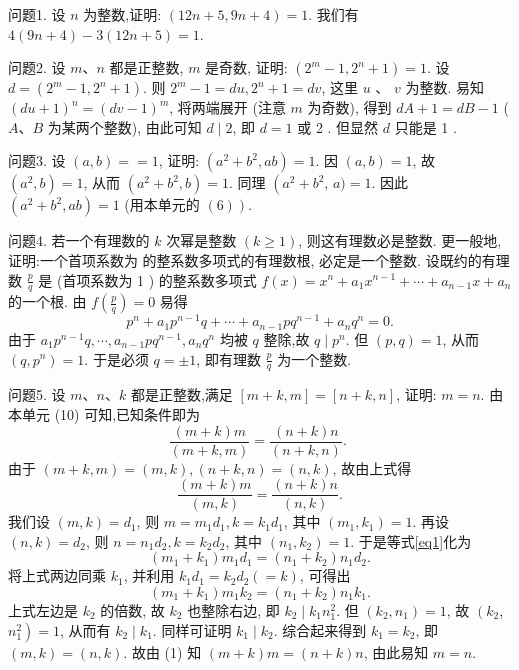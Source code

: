 
问题1. 设 $n$ 为整数,证明: $(12 n+5,9 n+4)=1$.
我们有 $4(9 n+4)-3(12 n+5)=1$.



问题2. 设 $m 、 n$ 都是正整数, $m$ 是奇数, 证明: $\left(2^m-1,2^n+1\right)=1$.
设 $d=\left(2^m-1,2^n+1\right)$. 则 $2^m-1=d u, 2^n+1=d v$, 这里 $u$ 、 $v$ 为整数.
易知 $(d u+1)^n=(d v-1)^m$, 将两端展开 (注意 $m$ 为奇数), 得到 $d A+ 1=d B-1$ ( $A 、 B$ 为某两个整数), 由此可知 $d \mid 2$, 即 $d=1$ 或 2 . 但显然 $d$ 只能是 1 .



问题3. 设 $(a, b)==1$, 证明: $\left(a^2+b^2, a b\right)=1$.
因 $(a, b)=1$, 故 $\left(a^2, b\right)=1$, 从而 $\left(a^2+b^2, b\right)=1$. 同理 $\left(a^2+b^2\right.$, $a)=1$. 因此 $\left(a^2+b^2, a b\right)=1$ (用本单元的 $\left.(6)\right)$.



问题4. 若一个有理数的 $k$ 次幂是整数 $(k \geqslant 1)$, 则这有理数必是整数.
更一般地, 证明:一个首项系数为  的整系数多项式的有理数根, 必定是一个整数.
设既约的有理数 $\frac{p}{q}$ 是 (首项系数为 1 ) 的整系数多项式 $f(x)=x^n+ a_1 x^{n-1}+\cdots+a_{n-1} x+a_n$ 的一个根.
由 $f\left(\frac{p}{q}\right)=0$ 易得
$$
p^n+a_1 p^{n-1} q+\cdots+a_{n-1} p q^{n-1}+a_n q^n=0 .
$$
由于 $a_1 p^{n-1} q, \cdots, a_{n-1} p q^{n-1}, a_n q^n$ 均被 $q$ 整除,故 $q \mid p^n$. 但 $(p, q)=1$, 从而 $\left(q, p^n\right)=1$. 于是必须 $q= \pm 1$, 即有理数 $\frac{p}{q}$ 为一个整数.



问题5. 设 $m 、 n 、 k$ 都是正整数,满足 $[m+k, m]=[n+k, n]$, 证明: $m=n$.
由本单元 (10) 可知,已知条件即为
$$
\frac{(m+k) m}{(m+k, m)}=\frac{(n+k) n}{(n+k, n)} \text {. }
$$
由于 $(m+k, m)=(m, k),(n+k, n)=(n, k)$, 故由上式得
$$
\frac{(m+k) m}{(m, k)}=\frac{(n+k) n}{(n, k)} . \label{eq1}
$$
我们设 $(m, k)=d_1$, 则 $m=m_1 d_1, k=k_1 d_1$, 其中 $\left(m_1, k_1\right)=1$.
再设 $(n, k)=d_2$, 则 $n=n_1 d_2, k=k_2 d_2$, 其中 $\left(n_1, k_2\right)=1$. 于是等式\ref{eq1}化为
$$
\left(m_1+k_1\right) m_1 d_1=\left(n_1+k_2\right) n_1 d_2 .
$$
将上式两边同乘 $k_1$, 并利用 $k_1 d_1=k_2 d_2(=k)$, 可得出
$$
\left(m_1+k_1\right) m_1 k_2=\left(n_1+k_2\right) n_1 k_1 .
$$
上式左边是 $k_2$ 的倍数, 故 $k_2$ 也整除右边, 即 $k_2 \mid k_1 n_1^2$. 但 $\left(k_2, n_1\right)=1$, 故 $\left(k_2\right.$, $\left.n_1^2\right)=1$, 从而有 $k_2 \mid k_1$. 同样可证明 $k_1 \mid k_2$. 综合起来得到 $k_1=k_2$, 即 $(m, k)= (n, k)$. 故由 (1) 知 $(m+k) m=(n+k) n$, 由此易知 $m=n$.


